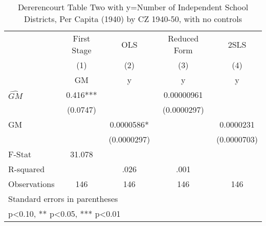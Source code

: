 \begin{table}[htbp]\centering
\def\sym#1{\ifmmode^{#1}\else\(^{#1}\)\fi}
\caption{Dererencourt Table Two with y=Number of Independent School Districts, Per Capita (1940) by CZ 1940-50, with no controls}
\begin{tabular}{l*{4}{c}}
\toprule
                    & First Stage   &         OLS   &Reduced Form   &        2SLS   \\
                    &\multicolumn{1}{c}{(1)}&\multicolumn{1}{c}{(2)}&\multicolumn{1}{c}{(3)}&\multicolumn{1}{c}{(4)}\\
                    &\multicolumn{1}{c}{GM}&\multicolumn{1}{c}{y}&\multicolumn{1}{c}{y}&\multicolumn{1}{c}{y}\\
\midrule
$\hat{GM}$          &       0.416***&               &  0.00000961   &               \\
                    &    (0.0747)   &               & (0.0000297)   &               \\
\addlinespace
GM                  &               &   0.0000586*  &               &   0.0000231   \\
                    &               & (0.0000297)   &               & (0.0000703)   \\
\midrule
F-Stat              &      31.078   &               &               &               \\
R-squared           &               &        .026   &        .001   &               \\
Observations        &         146   &         146   &         146   &         146   \\
\bottomrule
\multicolumn{5}{l}{\footnotesize Standard errors in parentheses}\\
\multicolumn{5}{l}{\footnotesize * p<0.10, ** p<0.05, *** p<0.01}\\
\end{tabular}
\end{table}
